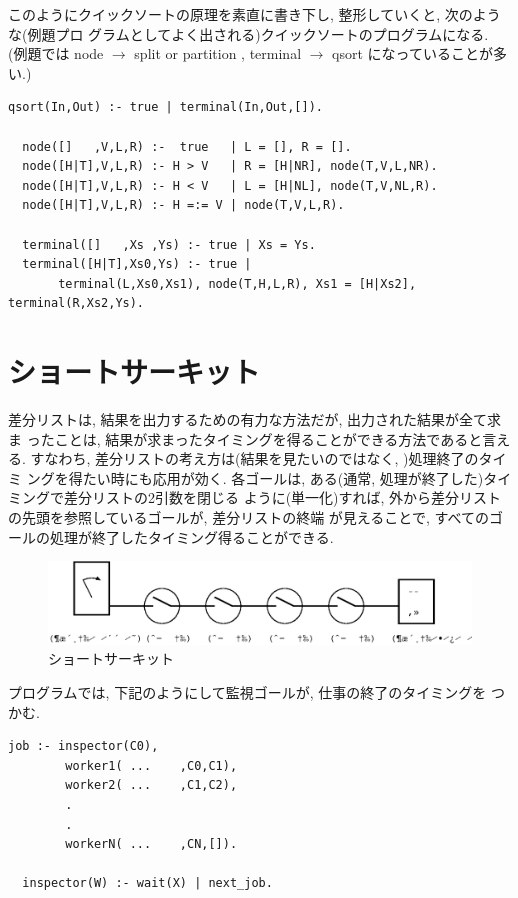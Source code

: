 \documentclass[a4,titlepage]{jsreport}
\begin{document}
  このようにクイックソートの原理を素直に書き下し,  整形していくと,  
次のような(例題プロ
グラムとしてよく出される)クイックソートのプログラムになる. 
(例題では node $\rightarrow$ split or partition , terminal $\rightarrow$ qsort 
になっていることが多い.)

\begin{Verbatim}[baselinestretch=0.8]
  qsort(In,Out) :- true | terminal(In,Out,[]).

  node([]   ,V,L,R) :-  true   | L = [], R = [].
  node([H|T],V,L,R) :- H > V   | R = [H|NR], node(T,V,L,NR).
  node([H|T],V,L,R) :- H < V   | L = [H|NL], node(T,V,NL,R).
  node([H|T],V,L,R) :- H =:= V | node(T,V,L,R).

  terminal([]   ,Xs ,Ys) :- true | Xs = Ys.
  terminal([H|T],Xs0,Ys) :- true |
       terminal(L,Xs0,Xs1), node(T,H,L,R), Xs1 = [H|Xs2], terminal(R,Xs2,Ys).
\end{Verbatim}

\section{ショートサーキット}
  差分リストは,  結果を出力するための有力な方法だが,  出力された結果が全て求ま
ったことは,  結果が求まったタイミングを得ることができる方法であると言える.  
  すなわち,  差分リストの考え方は(結果を見たいのではなく, )処理終了のタイミ
ングを得たい時にも応用が効く.  
  各ゴールは,  ある(通常, 処理が終了した)タイミングで差分リストの2引数を閉じる
ように(単一化)すれば,  外から差分リストの先頭を参照しているゴールが,  
差分リストの終端
が見えることで,  すべてのゴールの処理が終了したタイミング得ることができる.  

\begin{figure}[htbp]
  \begin{center}
    \includegraphics[width=.8\textwidth]{fig/dlt9.eps}
    \caption{ショートサーキット}
  \end{center}
\end{figure}
  プログラムでは,  下記のようにして監視ゴールが,  仕事の終了のタイミングを
つかむ.

\begin{Verbatim}[baselinestretch=0.8]
  job :- inspector(C0),
        worker1( ...    ,C0,C1),
        worker2( ...    ,C1,C2),
        .
        .
        workerN( ...    ,CN,[]).

  inspector(W) :- wait(X) | next_job.
\end{Verbatim}
\end{document}
